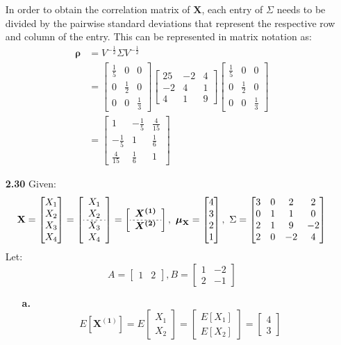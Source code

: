 \documentclass[oneside,12pt,letterpaper]{article}
\newcommand\m[1]{\begin{bmatrix}#1\end{bmatrix}}
\begin{document}
\begin{enumerate}
			In order to obtain the correlation matrix of $\textbf{X}$, each entry of $\Sigma$ needs to be divided by the pairwise standard deviations that represent the respective row and column of the entry. This can be represented in matrix notation as:
			\begin{align*}
				\boldsymbol{\rho} &= V^{-\frac{1}{2}} \Sigma V^{-\frac{1}{2}} \\
													&= \m{\frac{1}{5}&0&0\\0&\frac{1}{2}&0\\0&0&\frac{1}{3}} 
													\m{25&-2&4\\-2&4&1\\4&1&9}
													\m{\frac{1}{5}&0&0\\0&\frac{1}{2}&0\\0&0&\frac{1}{3}} \\
													&= \m{1&-\frac{1}{5}&\frac{4}{15}\\-\frac{1}{5}&1&\frac{1}{6}\\\frac{4}{15}&\frac{1}{6}&1}
			\end{align*}

		\pagebreak
		\item[\textbf{2.30}]
			Given:
			$$\textbf{X}=\m{X_{1}\\X_{2}\\X_{3}\\X_{4}}
			=\left[\begin{array}{c}X_{1}\\X_{2}\\\hdashline[2pt/2pt]X_{3}\\X_{4} \end{array}\right]
			=\left[\begin{array}{c}\boldsymbol{X^{(1)}}\\\hdashline[2pt/2pt]\boldsymbol{X^{(2)}} \end{array}\right],\ 
			\boldsymbol{\mu}_{\textbf{X}} = \m{4\\3\\2\\1},\ 
			\Sigma=\m{3&0&2&2\\0&1&1&0\\2&1&9&-2\\2&0&-2&4}$$
			Let:$$A=\m{1&2}, B=\m{1&-2\\2&-1}$$ 

			\begin{enumerate}
				\item[\textbf{a.}]
					$$E[\boldsymbol{X^{(1)}}] 
					= E\m{X_{1}\\X_{2}} 
					= \m{E[X_{1}]\\E[X_{2}]} 
					= \m{4\\3}$$


\end{enumerate}
\end{enumerate}
\end{document}
